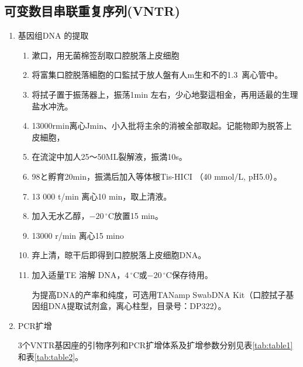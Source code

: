 \documentclass[AutoFakeBold]{LZUThesis}
\begin{document}
\subsection{可变数目串联重复序列(VNTR)}
\begin{enumerate}
    \item 基因组DNA 的提取\par
    \begin{enumerate}
        \item 漱口，用无菌棉签刮取口腔脱落上皮细胞\par
        \item 将富集口腔脱落細胞的口監拭于放人盤有人m生和不的1.3\, \mu{}离心管中。\par
        \item 将拭子置于振荡器上，振荡1min 左右，少心地娶這相金，再用适最的生理盐水冲洗。\par
        \item 13000rmin离心Jmin、小入批将主余的消被全部取起。记能物即为脱答上皮細胞，\par
        \item 在流淀中加人25～50ML裂解液，振満10s。\par
        \item 98と孵育20min，振満后加入等体根Tis-HICI （40 mmol/L, pH5.0）。\par
        \item 13 000 t/min 离心10 min，取上清液。\par
        \item 加入无水乙醇，$-20\,^\circ\mathrm{C}$放置15 min。\par
        \item 13000 r/min 离心15 mino\par
        \item 弃上清，晾干后即得到口腔脱落上皮细胞DNA。\par
        \item 加入适量TE 溶解 DNA，$4\,^\circ\mathrm{C}$或$-20\,^\circ\mathrm{C}$保存待用。\par
        为提高DNA的产率和纯度，可选用TANamp SwabDNA Kit（口腔拭子基因组DNA提取试剂盒，离心柱型，目录号：DP322）。\par
    \end{enumerate}
    \item PCR扩增\par
    3个VNTR基因座的引物序列和PCR扩增体系及扩增参数分别见表\ref{tab:table1}和表\ref{tab:table2}。\par
    \begin{longtable}{c|p{4.7cm}cccc}

\end{longtable}
\end{enumerate}
\end{document}
